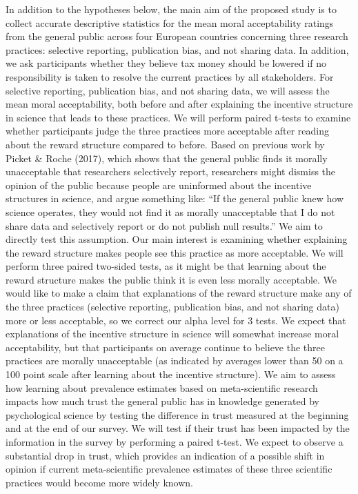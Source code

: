 \documentclass[
  man,floatsintext]{apa7}
\begin{document}
In addition to the hypotheses below, the main aim of the proposed study is to collect
accurate descriptive statistics for the mean moral acceptability ratings from the general
public across four European countries concerning three research practices: selective
reporting, publication bias, and not sharing data. In addition, we ask participants whether
they believe tax money should be lowered if no responsibility is taken to resolve the
current practices by all stakeholders.
For selective reporting, publication bias, and not sharing data, we will assess the mean
moral acceptability, both before and after explaining the incentive structure in science that
leads to these practices. We will perform paired t-tests to examine whether participants
judge the three practices more acceptable after reading about the reward structure
compared to before. Based on previous work by Picket \& Roche (2017), which shows that
the general public finds it morally unacceptable that researchers selectively report,
researchers might dismiss the opinion of the public because people are uninformed about
the incentive structures in science, and argue something like: ``If the general public knew
how science operates, they would not find it as morally unacceptable that I do not share
data and selectively report or do not publish null results.'' We aim to directly test this
assumption. Our main interest is examining whether explaining the reward structure
makes people see this practice as more acceptable. We will perform three paired two-sided tests, as it might be that learning about the reward structure makes the public think it
is even less morally acceptable. We would like to make a claim that explanations of the
reward structure make any of the three practices (selective reporting, publication bias, and
not sharing data) more or less acceptable, so we correct our alpha level for 3 tests. We
expect that explanations of the incentive structure in science will somewhat increase moral
acceptability, but that participants on average continue to believe the three practices are
morally unacceptable (as indicated by averages lower than 50 on a 100 point scale after
learning about the incentive structure).
We aim to assess how learning about prevalence estimates based on meta-scientific
research impacts how much trust the general public has in knowledge generated by
psychological science by testing the difference in trust measured at the beginning and at
the end of our survey. We will test if their trust has been impacted by the information in the
survey by performing a paired t-test. We expect to observe a substantial drop in trust,
which provides an indication of a possible shift in opinion if current meta-scientific
prevalence estimates of these three scientific practices would become more widely known.
\end{document}
